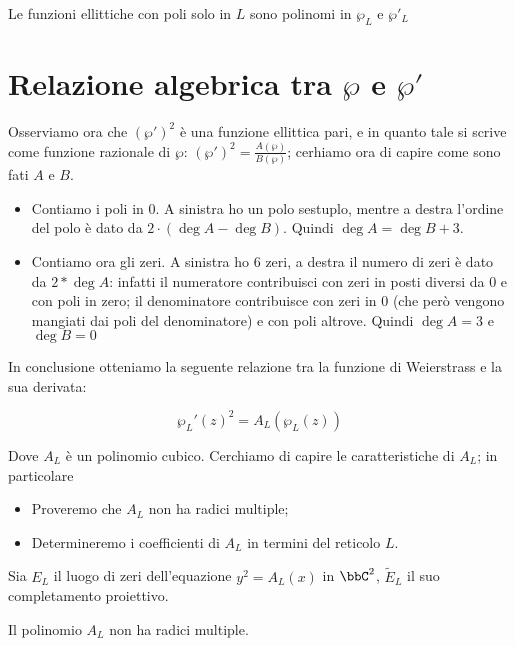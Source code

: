 \begin{corollario}
    Le funzioni ellittiche con poli solo in $L$ sono polinomi in $\wp_L$ e $\wp'_L$
\end{corollario}



\section{Relazione algebrica tra $\wp$ e $\wp'$}
Osserviamo ora che $(\wp')^2$ è una funzione ellittica pari, e in quanto tale si scrive come funzione razionale di $\wp$:
$(\wp')^2=\frac{A(\wp)}{B(\wp)}$; cerhiamo ora di capire come sono fati $A$ e $B$.

\begin{itemize}
 \item Contiamo i poli in 0. A sinistra ho un polo sestuplo, mentre a destra l'ordine del polo è dato da $2\cdot (\deg A - \deg B)$. Quindi $\deg A = \deg B + 3$.
 \item Contiamo ora gli zeri. A sinistra ho 6 zeri, a destra il numero di zeri è dato da $2*\deg A$: infatti il numeratore contribuisci con zeri in posti diversi da 0 e con poli in zero; il denominatore contribuisce con zeri in 0 (che però vengono mangiati dai poli del denominatore) e con poli altrove. Quindi $\deg A = 3$ e $\deg B=0$
\end{itemize}

In conclusione otteniamo la seguente relazione tra la funzione di Weierstrass e la sua derivata:

$$\wp_L'(z)^2 = A_L(\wp_L(z)) $$

Dove $A_L$ è un polinomio cubico. Cerchiamo di capire le caratteristiche di $A_L$; in particolare
\begin{itemize}
\item Proveremo che $A_L$ non ha radici multiple;
\item Determineremo i coefficienti di $A_L$ in termini del reticolo $L$.
\end{itemize}

Sia $E_L$ il luogo di zeri dell'equazione $y^2=A_L(x)$ in $\bbC^2$, $\tilde{E}_L$ il suo completamento proiettivo.
\begin{proposizione}
Il polinomio $A_L$ non ha radici multiple.
\end{proposizione}

